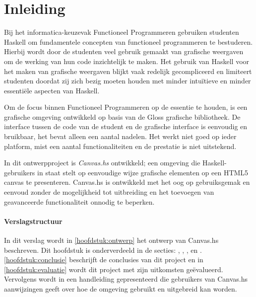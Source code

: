 \chapter{Inleiding}
Bij het informatica-keuzevak Functioneel Programmeren gebruiken studenten Haskell om fundamentele concepten van functioneel programmeren te bestuderen. Hierbij wordt door de studenten veel gebruik gemaakt van grafische weergaven om de werking van hun code inzichtelijk te maken. Het gebruik van Haskell voor het maken van grafische weergaven blijkt vaak redelijk gecompliceerd en limiteert studenten doordat zij zich bezig moeten houden met minder intuïtieve en minder essentiële aspecten van Haskell.

Om de focus binnen Functioneel Programmeren op de essentie te houden, is een grafische omgeving ontwikkeld op basis van de Gloss grafische bibliotheek. De interface tussen de code van de student en de grafische interface is eenvoudig en bruikbaar, het bevat alleen een aantal nadelen. Het werkt niet goed op ieder platform, mist een aantal functionaliteiten en de prestatie is niet uitstekend.

In dit ontwerpproject is \emph{Canvas.hs} ontwikkeld; een omgeving die Haskell-gebruikers in staat stelt op eenvoudige wijze grafische elementen op een HTML5 canvas te presenteren. Canvas.hs is ontwikkeld met het oog op gebruiksgemak en eenvoud zonder de mogelijkheid tot uitbreiding en het toevoegen van geavanceerde functionaliteit onnodig te beperken.

\subsubsection{Verslagstructuur}
In dit verslag wordt in \autoref{hoofdstuk:ontwerp} het ontwerp van Canvas.hs beschreven. Dit hoofdstuk is onderverdeeld in de secties: , , ,  en . \autoref{hoofdstuk:conclusie} beschrijft de conclusies van dit project en in \autoref{hoofdstuk:evaluatie} wordt dit project met zijn uitkomsten geëvalueerd. Vervolgens wordt in  een handleiding gepresenteerd die gebruikers van Canvas.hs aanwijzingen geeft over hoe de omgeving gebruikt en uitgebreid kan worden.


